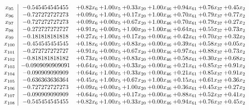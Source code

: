 \documentclass[8pt]{article}
\begin{document}
\[\begin{array}{c| c c@{\hskip 2pt} c@{\hskip 2pt} c@{\hskip 2pt} c@{\hskip 2pt} c@{\hskip 2pt} c@{\hskip 2pt} c@{\hskip 2pt} }
 x_{95}   &  -0.545454545455 & +  0.82 x_{6} & +  1.00 x_{5} & +  0.33 x_{20} & +  1.00 x_{46} & +  0.94 x_{61} & +  0.76 x_{37} & +  0.45 x_{2}\\
 x_{96}   &  -0.727272727273 & +  0.09 x_{6} & +  1.00 x_{5} & +  0.17 x_{20} & +  1.00 x_{46} & +  0.70 x_{61} & +  0.79 x_{37} & +  0.77 x_{2}\\
 x_{97}   &  -0.727272727273 & +  0.09 x_{6} & +  0.00 x_{5} & +  0.67 x_{20} & +  1.00 x_{46} & +  0.70 x_{61} & +  0.79 x_{37} & +  0.27 x_{2}\\
 x_{98}   &  -0.272727272727 & +  0.91 x_{6} & +  0.00 x_{5} & +  1.00 x_{20} & +  1.00 x_{46} & +  0.64 x_{61} & +  0.55 x_{37} & +  0.73 x_{2}\\
 x_{99}   &  -0.181818181818 & +  0.27 x_{6} & +  1.00 x_{5} & +  0.17 x_{20} & +  0.00 x_{46} & +  0.42 x_{61} & +  0.70 x_{37} & +  0.32 x_{2}\\
 x_{100}   &  -0.454545454545 & +  0.18 x_{6} & +  0.00 x_{5} & +  0.83 x_{20} & +  0.00 x_{46} & +  0.39 x_{61} & +  0.58 x_{37} & +  0.05 x_{2}\\
 x_{101}   &  -0.272727272727 & +  0.91 x_{6} & +  0.00 x_{5} & +  0.67 x_{20} & +  0.00 x_{46} & +  0.97 x_{61} & +  0.88 x_{37} & +  0.73 x_{2}\\
 x_{102}   &  -0.818181818182 & +  0.73 x_{6} & +  0.00 x_{5} & +  0.83 x_{20} & +  0.00 x_{46} & +  0.58 x_{61} & +  0.30 x_{37} & +  0.68 x_{2}\\
 x_{103}   &  -0.0909090909091 & +  0.64 x_{6} & +  0.00 x_{5} & +  0.33 x_{20} & +  0.00 x_{46} & +  0.21 x_{61} & +  0.85 x_{37} & +  0.91 x_{2}\\
 x_{104}   &  -0.090909090909 & +  0.64 x_{6} & +  1.00 x_{5} & +  0.33 x_{20} & +  0.00 x_{46} & +  0.21 x_{61} & +  0.85 x_{37} & +  0.91 x_{2}\\
 x_{105}   &  -0.636363636364 & +  0.45 x_{6} & +  1.00 x_{5} & +  0.67 x_{20} & +  1.00 x_{46} & +  0.15 x_{61} & +  0.61 x_{37} & +  0.36 x_{2}\\
 x_{106}   &  -0.727272727273 & +  0.09 x_{6} & +  0.00 x_{5} & +  1.00 x_{20} & +  0.00 x_{46} & +  0.36 x_{61} & +  0.45 x_{37} & +  0.27 x_{2}\\
 x_{107}   &  -0.090909090909 & +  0.64 x_{6} & +  0.00 x_{5} & +  0.17 x_{20} & +  0.00 x_{46} & +  0.88 x_{61} & +  0.52 x_{37} & +  0.41 x_{2}\\
 x_{108}   &  -0.545454545455 & +  0.82 x_{6} & +  1.00 x_{5} & +  0.33 x_{20} & +  0.00 x_{46} & +  0.94 x_{61} & +  0.76 x_{37} & +  0.45 x_{2}\\

\end{array}\]
\end{document}
